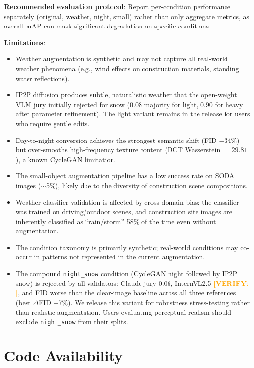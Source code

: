 \documentclass[12pt]{article}
\newcommand{\verify}[1]{\textcolor{orange}{\textbf{[VERIFY: #1]}}}
\begin{document}
\textbf{Recommended evaluation protocol}: Report per-condition performance separately (original, weather, night, small) rather than only aggregate metrics, as overall mAP can mask significant degradation on specific conditions.

\textbf{Limitations}:
\begin{itemize}[noitemsep]
    \item Weather augmentation is synthetic and may not capture all real-world weather phenomena (e.g., wind effects on construction materials, standing water reflections).
    \item IP2P diffusion produces subtle, naturalistic weather that the open-weight VLM jury initially rejected for snow (0.08 majority for light, 0.90 for heavy after parameter refinement). The light variant remains in the release for users who require gentle edits.
    \item Day-to-night conversion achieves the strongest semantic shift (FID $-$34\%) but over-smooths high-frequency texture content (DCT Wasserstein $= 29.81$), a known CycleGAN limitation.
    \item The small-object augmentation pipeline has a low success rate on SODA images ($\sim$5\%), likely due to the diversity of construction scene compositions.
    \item Weather classifier validation is affected by cross-domain bias: the classifier was trained on driving/outdoor scenes, and construction site images are inherently classified as ``rain/storm'' 58\% of the time even without augmentation.
    \item The condition taxonomy is primarily synthetic; real-world conditions may co-occur in patterns not represented in the current augmentation.
    \item The compound \texttt{night\_snow} condition (CycleGAN night followed by IP2P snow) is rejected by all validators: Claude jury 0.06, InternVL2.5 \verify{}, and FID worse than the clear-image baseline across all three references (best $\Delta$FID $+$7\%). We release this variant for robustness stress-testing rather than realistic augmentation. Users evaluating perceptual realism should exclude \texttt{night\_snow} from their splits.
\end{itemize}


\section{Code Availability}
\end{document}
